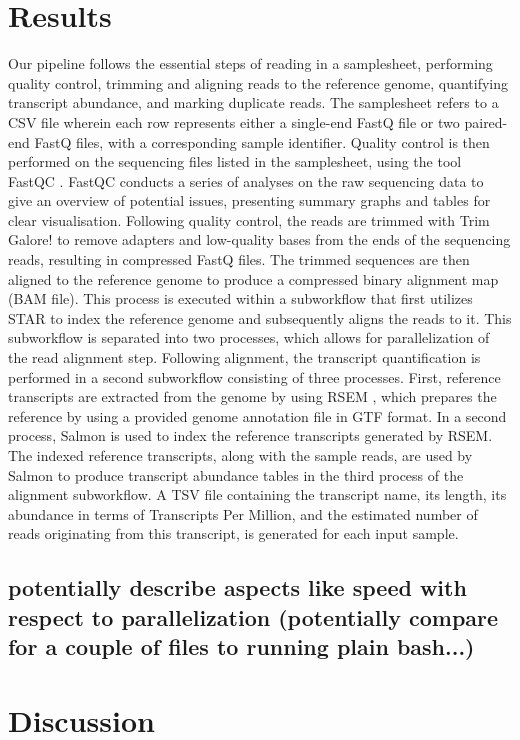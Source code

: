 \documentclass{article}
\theoremstyle{plain}
\theoremstyle{definition}
\theoremstyle{remark}
\begin{document}
\section{Results}
Our pipeline follows the essential steps of reading in a samplesheet, performing quality control, trimming and aligning reads to the reference genome, quantifying transcript abundance, and marking duplicate reads.
The samplesheet refers to a CSV file wherein each row represents either a single-end FastQ file or two paired-end FastQ files, with a corresponding sample identifier. Quality control is then performed on the sequencing files listed in the samplesheet, using the tool FastQC \cite{fastqc}. FastQC conducts a series of analyses on the raw sequencing data to give an overview of potential issues, presenting summary graphs and tables for clear visualisation.
Following quality control, the reads are trimmed with Trim Galore! \cite{trimgalore} to remove adapters and low-quality bases from the ends of the sequencing reads, resulting in compressed FastQ files.
The trimmed sequences are then aligned to the reference genome to produce a compressed binary alignment map (BAM file). This process is executed within a subworkflow that first utilizes STAR \cite{Dobin2012} to index the reference genome and subsequently aligns the reads to it. This subworkflow is separated into two processes, which allows for parallelization of the read alignment step.
Following alignment, the transcript quantification is performed in a second subworkflow consisting of three processes. First, reference transcripts are extracted from the genome by using RSEM \cite{Li2011}, which prepares the reference by using a provided genome annotation file in GTF format.
In a second process, Salmon \cite{Patro2017} is used to index the reference transcripts generated by RSEM. The indexed reference transcripts, along with the sample reads, are used by Salmon to produce transcript abundance tables in the third process of the alignment subworkflow. A TSV file containing the transcript name, its length, its abundance in terms of Transcripts Per Million, and the estimated number of reads originating from this transcript, is generated for each input sample.

\subsection{potentially describe aspects like speed with respect to parallelization (potentially compare for a couple of files to running plain bash...)}
\section{Discussion}
\end{document}
